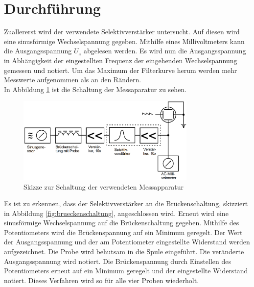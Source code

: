 \section{Durchführung}
\label{sec:Durchführung}

Zuallererst wird der verwendete Selektivverstärker untersucht. Auf diesen wird
eine sinusförmige Wechselspannung gegeben. Mithilfe eines Millivoltmeters kann
die Ausgangsspannung $U_\text{a}$ abgelesen werden. Es wird nun die Ausgangsspannung
in Abhängigkeit der eingestellten Frequenz der eingehenden Wechselspannung gemessen
und notiert. Um das Maximum der Filterkurve herum werden mehr Messwerte aufgenommen als
an den Rändern.\\
In Abbildung \ref{fig:schaltung} ist die Schaltung der Messaparatur zu sehen.

\begin{figure}[H]
  \centering
  \includegraphics[width=250pt]{data/schaltung.png}
  \caption{Skizze zur Schaltung der verwendeten Messapparatur\cite{Versuchsanleitung}}
  \label{fig:schaltung}
\end{figure}

Es ist zu erkennen, dass der Selektivverstärker an die Brückenschaltung, skizziert in
Abbildung \ref{fig:brueckenschaltung}, angeschlossen wird. Erneut wird eine sinusförmige
Wechselspannung auf die Brückenschaltung gegeben. Mithilfe des Potentiometers wird die
Brückenspannung auf ein Minimum geregelt. Der Wert der Ausgangsspannung und der am Potentiometer
eingestellte Widerstand werden aufgezeichnet. Die Probe wird behutsam in die Spule eingeführt.
Die veränderte Ausgangsspannung wird notiert. Die Brückenspannung durch Einstellen
des Potentiometers erneut auf ein Minimum geregelt und der eingestellte Widerstand notiert.
Dieses Verfahren wird so für alle vier Proben wiederholt.
